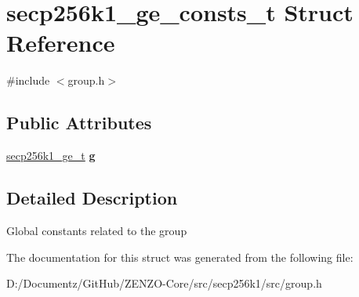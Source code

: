 \hypertarget{structsecp256k1__ge__consts__t}{}\section{secp256k1\+\_\+ge\+\_\+consts\+\_\+t Struct Reference}
\label{structsecp256k1__ge__consts__t}


{\ttfamily \#include $<$group.\+h$>$}

\subsection*{Public Attributes}
\begin{DoxyCompactItemize}
\item 
\mbox{\label{structsecp256k1__ge__consts__t_a194fb0ae067f1ad8f6d8c476e539dc8f}} 
\mbox{\hyperlink{structsecp256k1__ge__t}{secp256k1\+\_\+ge\+\_\+t}} {\bfseries g}
\end{DoxyCompactItemize}


\subsection{Detailed Description}
Global constants related to the group 

The documentation for this struct was generated from the following file\+:\begin{DoxyCompactItemize}
\item 
D\+:/\+Documentz/\+Git\+Hub/\+Z\+E\+N\+Z\+O-\/\+Core/src/secp256k1/src/group.\+h\end{DoxyCompactItemize}
